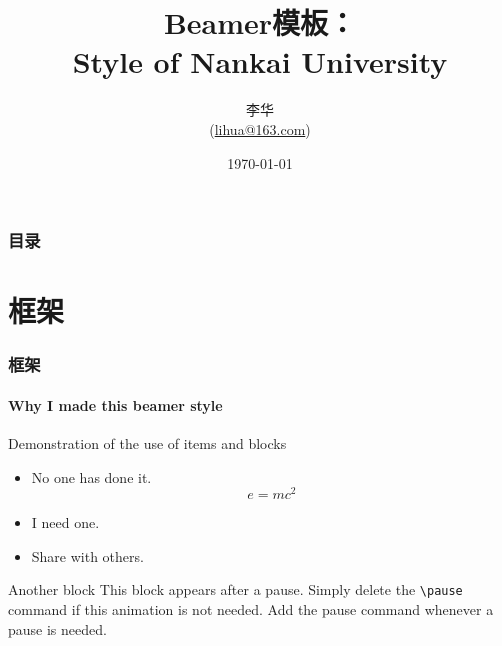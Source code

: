 \documentclass[UTF8]{beamer}
\title[Beamer模板]{Beamer模板：\\
Style of Nankai University}
\author[李华]{李华\\
(\url{lihua@163.com})}
\institute{南开大学XX学院}
\date{\today}
\begin{document}
\newtheorem{thm}{定理}[section]  %

\renewcommand{\contentsname}{目录}     %
\renewcommand{\abstractname}{摘要}     %
\renewcommand{\refname}{参考文献}      %
\renewcommand{\indexname}{索引}
\renewcommand{\figurename}{图}
\renewcommand{\tablename}{表}
\renewcommand{\appendixname}{附录}
\renewcommand{\proofname}{证明}
\renewcommand{\algorithm}{算法}
\begin{frame}[plain]
\maketitle
\end{frame}

\begin{frame}
\frametitle{目录}
\tableofcontents
\end{frame}
\section{框架}
\begin{frame}
\frametitle{框架}
\framesubtitle{Why I made this beamer style}
\begin{block}{Demonstration of the use of items and blocks}
\begin{itemize}
\item No one has done it.$$e=mc^2$$
\item I need one.
\pause \item Share with others.
\end{itemize}
\end{block}
\pause
\begin{block}{Another block}
This block appears after a pause. Simply delete the \texttt{\textbackslash pause} command if this animation is not needed. Add the pause command whenever a pause is needed. 
\end{block}
\end{frame}

\end{document}
